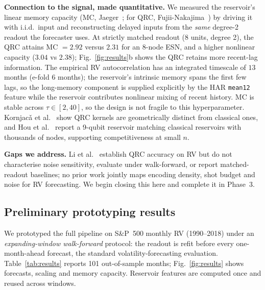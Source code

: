 \documentclass[11pt]{article}
\begin{document}
\textbf{Connection to the signal, made quantitative.} We measured the reservoir's linear memory capacity (MC, Jaeger~\cite{jaeger2001}; for QRC, Fujii-Nakajima~\cite{fujii2017}) by driving it with i.i.d.\ input and reconstructing delayed inputs from the \emph{same} degree-2 readout the forecaster uses. At strictly matched readout (8 units, degree 2), the QRC attains MC $=2.92$ versus $2.31$ for an 8-node ESN, and a higher nonlinear capacity ($3.04$ vs $2.38$); Fig.~\ref{fig:results}b shows the QRC retains more recent-lag information. The empirical RV autocorrelation has an integrated timescale of $13$ months (e-fold $6$ months); the reservoir's intrinsic memory spans the first few lags, so the long-memory component is supplied explicitly by the HAR \texttt{mean12} feature while the reservoir contributes nonlinear mixing of recent history. MC is stable across $\tau\in[2,40]$, so the design is not fragile to this hyperparameter. Kornjac\v{a} et al.~\cite{kornjaca2024} show QRC kernels are geometrically distinct from classical ones, and Hou et al.~\cite{hou2026} report a 9-qubit reservoir matching classical reservoirs with thousands of nodes, supporting competitiveness at small $n$.

\textbf{Gaps we address.} Li et al.~\cite{li2025} establish QRC accuracy on RV but do not characterise noise sensitivity, evaluate under walk-forward, or report matched-readout baselines; no prior work jointly maps encoding density, shot budget and noise for RV forecasting. We begin closing this here and complete it in Phase~3.

\subsection{Preliminary prototyping results}
\label{sec:proto}
We prototyped the full pipeline on S\&P~500 monthly RV (1990--2018) under an \emph{expanding-window walk-forward} protocol: the readout is refit before every one-month-ahead forecast, the standard volatility-forecasting evaluation. Table~\ref{tab:results} reports 101 out-of-sample months; Fig.~\ref{fig:results} shows forecasts, scaling and memory capacity. Reservoir features are computed once and reused across windows.
\end{document}
